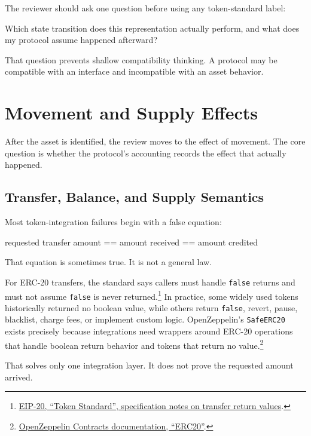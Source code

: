 The reviewer should ask one question before using any token-standard label:

\begin{codeblock}
Which state transition does this representation actually perform,
and what does my protocol assume happened afterward?
\end{codeblock}

That question prevents shallow compatibility thinking. A protocol may be compatible with an interface and incompatible with an asset behavior.

\section{Movement and Supply Effects}

After the asset is identified, the review moves to the effect of movement. The core question is whether the protocol's accounting records the effect that actually happened.

\subsection{Transfer, Balance, and Supply Semantics}

Most token-integration failures begin with a false equation:

\begin{codeblock}
requested transfer amount == amount received == amount credited
\end{codeblock}

That equation is sometimes true. It is not a general law.

For ERC-20 transfers, the standard says callers must handle \texttt{false} returns and must not assume \texttt{false} is never returned.\footnote{\href{https://eips.ethereum.org/EIPS/eip-20}{EIP-20, ``Token Standard'', specification notes on transfer return values}.} In practice, some widely used tokens historically returned no boolean value, while others return \texttt{false}, revert, pause, blacklist, charge fees, or implement custom logic. OpenZeppelin's \texttt{SafeERC20} exists precisely because integrations need wrappers around ERC-20 operations that handle boolean return behavior and tokens that return no value.\footnote{\href{https://docs.openzeppelin.com/contracts/5.x/api/token/ERC20}{OpenZeppelin Contracts documentation, ``ERC20''}.}

That solves only one integration layer. It does not prove the requested amount arrived.

